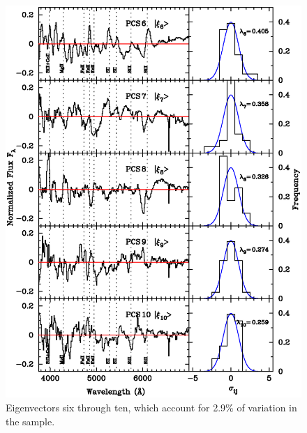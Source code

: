 \begin{figure}[htp]
\begin{center}
\includegraphics[angle=0,scale=0.8]{./figures/pca/20SNe_PCS_06to10_areanorm.ps}
\end{center}
\caption{
Eigenvectors six through ten, which account for 2.9\% of variation in the sample. 
}
\label{fig:eigen2}
\end{figure}
